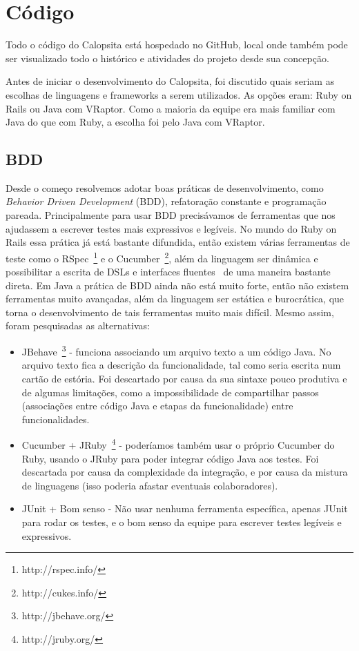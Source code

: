 \section{Código}
Todo o código do Calopsita está hospedado no GitHub, local onde também pode ser visualizado todo o histórico e atividades do projeto desde sua concepção.

Antes de iniciar o desenvolvimento do Calopsita, foi discutido quais seriam as escolhas de linguagens e frameworks a serem utilizados. As opções eram: Ruby on Rails ou Java com VRaptor. Como a maioria da equipe era mais familiar com Java do que com Ruby, a escolha foi pelo Java com VRaptor.

\subsection{BDD}
Desde o começo resolvemos adotar boas práticas de desenvolvimento, como {\it Behavior Driven Development} (BDD), 
refatoração constante e programação pareada. Principalmente para usar BDD precisávamos de ferramentas que nos 
ajudassem a escrever testes mais expressivos e legíveis. No mundo do Ruby on Rails essa prática já está bastante 
difundida, então existem várias ferramentas de teste como o RSpec~\footnote{http://rspec.info/} e o Cucumber~\footnote{http://cukes.info/}, além da linguagem ser dinâmica e possibilitar a escrita de DSLs e interfaces fluentes~\cite{dsl} de uma maneira bastante direta. Em Java a prática de BDD ainda não está muito forte, então não existem ferramentas muito avançadas, além da linguagem ser estática e burocrática, que torna o desenvolvimento de tais ferramentas muito mais difícil. Mesmo assim, foram pesquisadas as alternativas:

\begin{itemize}
	\item{JBehave~\footnote{http://jbehave.org/} - funciona associando um arquivo texto a um código Java. No arquivo texto fica a descrição da funcionalidade, tal como seria escrita num cartão de estória. Foi descartado por causa da sua sintaxe pouco produtiva e de algumas limitações, como a impossibilidade de compartilhar passos (associações entre código Java e etapas da funcionalidade) entre funcionalidades.}
	\item{Cucumber + JRuby~\footnote{http://jruby.org/} - poderíamos também usar o próprio Cucumber do Ruby, usando o JRuby para poder integrar código 
Java aos testes. Foi descartada por causa da complexidade da integração, e por causa da mistura de linguagens (isso poderia afastar eventuais colaboradores).}
	\item{JUnit + Bom senso - Não usar nenhuma ferramenta específica, apenas JUnit para rodar os testes, e o bom senso da 
equipe para escrever testes legíveis e expressivos.}
\end{itemize}


